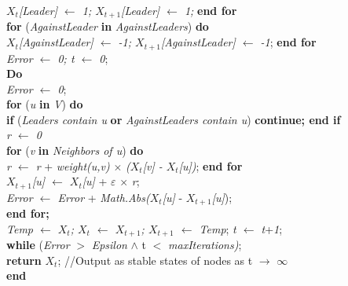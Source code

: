 \documentclass[5p,,preprint,12pt]{elsarticle}
\begin{document}
\hspace{0.5cm} \textit{$X_t$[Leader] $\gets$ 1; $X_{t+1}$[Leader] $\gets$ 1;} \textbf{end for} \\
\textbf{for} (\textit{AgainstLeader} \textbf{in} \textit{AgainstLeaders}) \textbf{do} \\
\hspace{0.5cm} \textit{$X_t$[AgainstLeader] $\gets$ -1; $X_{t+1}$[AgainstLeader] $\gets$ -1};
\textbf{end for} \\
\textit{Error $\gets$ 0; t $\gets$ 0};  \\
\textbf{Do} \\
\hspace{0.5cm} \textit{Error $\gets$ 0}; \\
\hspace{0.5cm} \textbf{for} (\textit{u} \textbf{in} \textit{V}) \textbf{do}  \\
\hspace{1cm}  \textbf{if} (\textit{Leaders contain u} \textbf{or} \textit{AgainstLeaders contain u}) \textbf{continue; end if} \\
\hspace{1cm} \textit{r $\gets$ 0} \\
\hspace{1cm} \textbf{for} (\textit{v} \textbf{in} \textit{Neighbors of u}) \textbf{do} \\
\hspace{1.5cm} \textit{r $\gets$ r} + \textit{weight(u,v)} $\times$ \textit{($X_t$[v] - $X_t$[u])}; \textbf{end for} \\
\hspace{1cm} \textit{$X_{t+1}$[u] $\gets$ $X_t$[u]} + $\varepsilon$ $\times$ \textit{r}; \\
\hspace{1cm} \textit{Error $\gets$ Error} + \textit{Math.Abs($X_t$[u]} - \textit{$X_{t+1}$[u]}); \\
\hspace{0.5cm} \textbf{end for;} \\
\hspace{0.5cm}  \textit{Temp $\gets$ $X_t$; $X_t$ $\gets$ $X_{t+1}$; $X_{t+1}$ $\gets$ Temp}; \textit{t $\gets$ t}+\textit{1}; \\
\textbf{while} (\textit{Error}  $>$ \textit{Epsilon} $\land$ t $<$ \textit{maxIterations)}; \\
\textbf{return} \textit{$X_t$}; //Output as stable states of nodes as t $\to$ $\infty$ \\
\textbf{end} \\
\end{document}
